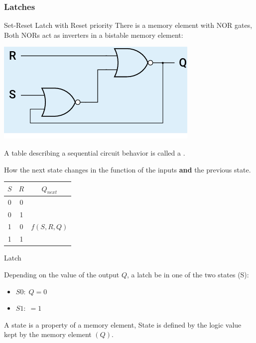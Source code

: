     \subsubsection{Latches}
    \begin{parag}{Set-Reset Latch with Reset priority}
        There is a memory element with NOR gates, \\
        Both NORs act as inverters in a bistable memory element:
        \begin{center}
            \includegraphics[scale=0.5]{42025-03-31.png}
        \end{center}
        \begin{definition}
            A table describing a sequential circuit behavior is called a .
        \end{definition}
        How the next state changes in the function of the inputs \textbf{and} the previous state.
        \begin{center} \begin{tabular}{cc|c}$S$ & $R$ & $Q_{next}$ \\ \hline  0 & 0 &  \\ 0 & 1 &  \\ 1 & 0 & $f\left(S, R, Q\right)$ \\ 1 & 1 &  \end{tabular} \end{center} 
       \begin{subparag}{Latch}
           \begin{definition}
               Depending on the value of the output $Q$,  a latch be in one of the two states (S):
               \begin{itemize}
                   \item $S0: \; Q = 0$
                   \item $S1:\; = 1$
               \end{itemize}
               A state is a property of a memory element, State is defined by the logic value kept by the memory element $(Q)$.

\end{definition}
\end{subparag}
\end{parag}
